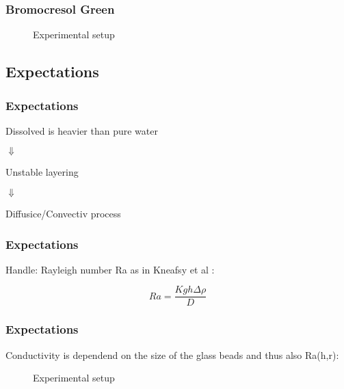 \begin{frame}
	\frametitle{Bromocresol Green}
	
	\begin{figure}
	  \centering
	  \caption{Experimental setup}
	\end{figure}
\end{frame}

\subsection{Expectations}
\begin{frame}
	\frametitle{Expectations}
	\vspace{1cm} %
	
	\centering
	Dissolved \COT is heavier than pure water
	
	\pause
	$\Downarrow$
	
	Unstable layering
	
	\pause
	$\Downarrow$
	
	Diffusice/Convectiv process
	
\end{frame}

\begin{frame}
	\frametitle{Expectations}
	\vspace{1cm} %
	
	Handle: Rayleigh number Ra as in Kneafsy et al \cite{2010:CO2}:
	
	\begin{equation*}
	  Ra = \frac{Kgh \Delta\rho}{D}
	\end{equation*}

	
\end{frame}

\begin{frame}
	\frametitle{Expectations}
	\vspace{1cm} %
	
	Conductivity is dependend on the size of the glass beads and thus also Ra(h,r):
	
	\begin{figure}
	  \centering
	  \caption{Experimental setup}
	\end{figure}

	
\end{frame}




